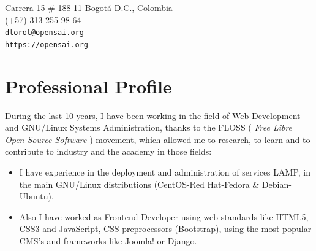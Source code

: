 \documentclass[overlapped,line,final]{res}
\begin{document}

\begin{resume}


\begin{minipage}{\linewidth}
	\begin{minipage}{0.5\linewidth}
    		Carrera 15 \# 188-11  \newline 
    		Bogotá D.C., Colombia \\ 
    		(+57) 313 255 98 64 \\ 
    		{\tt dtorot@opensai.org} \\ 
     	{\tt https://opensai.org} \\ 
	\end{minipage}
	\begin{minipage}{0.5\linewidth}
		\begin{center}
		\end{center}
	\end{minipage}
\end{minipage}


\vspace{0.5cm}
\section{\sc Professional Profile}
\vspace{0.5cm}
During the last 10 years, I have been working in the field of Web Development and GNU/Linux Systems Administration, thanks to the FLOSS ( {\em Free Libre Open Source Software } ) movement, which allowed me to research, to learn and to contribute to industry and the academy in those fields:

\vspace{2mm}
\begin{itemize}
    \item I have experience in the deployment and administration of services LAMP, in the main GNU/Linux distributions (CentOS-Red Hat-Fedora \& Debian-Ubuntu). 

    \item Also I have worked as Frontend Developer using web standards like HTML5, CSS3 and JavaScript, CSS preprocessors (Bootstrap), using the most popular CMS's and frameworks like Joomla! or Django.


\end{itemize}
\end{resume}
\end{document}
